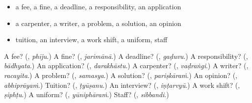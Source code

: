 \begin{itemize}
\raggedright
  \item a fee, a fine, a deadline, a responsibility, an application
  \item a carpenter, a writer, a problem, a solution, an opinion
  \item tuition, an interview, a work shift, a uniform, staff
\end{itemize}

\begin{tcolorbox}[breakable,colback=teal!4,colframe=teal!35!black,title={Before you move on}]
A fee? (\textbf{}, \emph{phīju}.) A fine? (\textbf{}, \emph{jarimānā}.) A deadline? (\textbf{}, \emph{gaḍuvu}.) A responsibility? (\textbf{}, \emph{bādhyata}.) An application? (\textbf{}, \emph{darakhāstu}.) A carpenter? (\textbf{}, \emph{vaḍraṅgi}.) A writer? (\textbf{}, \emph{racayita}.) A problem? (\textbf{}, \emph{samasya}.) A solution? (\textbf{}, \emph{pariṣkāraṁ}.) An opinion? (\textbf{}, \emph{abhiprāyaṁ}.) Tuition? (\textbf{}, \emph{ṭyūṣanu}.) An interview? (\textbf{}, \emph{iṇṭarvyū}.) A work shift? (\textbf{}, \emph{ṣiphṭu}.) A uniform? (\textbf{}, \emph{yūniphāraṁ}.) Staff? (\textbf{}, \emph{sibbandi}.)
\end{tcolorbox}

